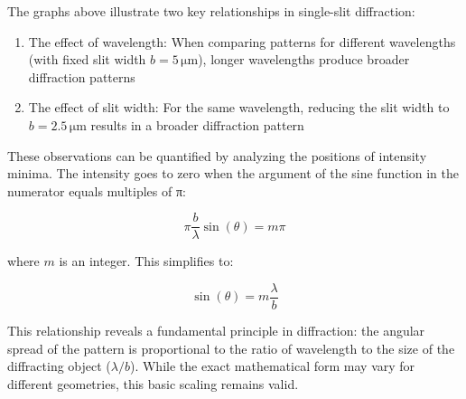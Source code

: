\documentclass[
  a4paper,
]{book}
\providecommand{\tightlist}{%
  \setlength{\itemsep}{0pt}\setlength{\parskip}{0pt}}
\begin{document}
The graphs above illustrate two key relationships in single-slit
diffraction:

\begin{enumerate}
\def\labelenumi{\arabic{enumi}.}
\tightlist
\item
  The effect of wavelength: When comparing patterns for different
  wavelengths (with fixed slit width \(b=5\,\mathrm{\mu m}\)), longer
  wavelengths produce broader diffraction patterns
\item
  The effect of slit width: For the same wavelength, reducing the slit
  width to \(b=2.5\,\mathrm{\mu m}\) results in a broader diffraction
  pattern
\end{enumerate}

These observations can be quantified by analyzing the positions of
intensity minima. The intensity goes to zero when the argument of the
sine function in the numerator equals multiples of π:

\[
\pi \frac{b}{\lambda}\sin(\theta) = m\pi
\]

where \(m\) is an integer. This simplifies to:

\[
\sin(\theta)=m\frac{\lambda}{b}
\]

This relationship reveals a fundamental principle in diffraction: the
angular spread of the pattern is proportional to the ratio of wavelength
to the size of the diffracting object (\(\lambda/b\)). While the exact
mathematical form may vary for different geometries, this basic scaling
remains valid.
\end{document}
